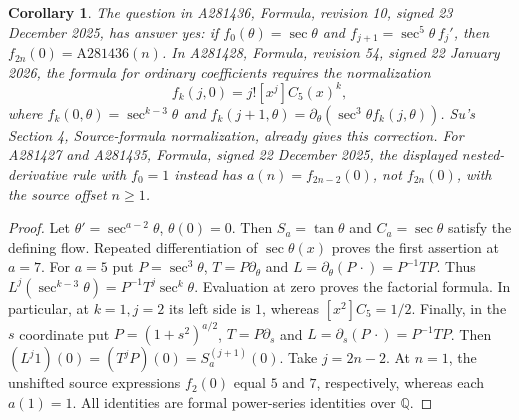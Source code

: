 \documentclass[11pt]{article}
\newtheorem{corollary}[theorem]{Corollary}
\newcommand{\Q}{\mathbb Q}
\begin{document}
\begin{corollary}\label{cor:formulas}
The question in A281436, Formula, revision 10, signed
23 December 2025, has answer yes: if
$f_0(\theta)=\sec\theta$ and
$f_{j+1}=\sec^5\theta\,f_j'$, then
$f_{2n}(0)=\mathrm{A281436}(n)$.
In A281428, Formula, revision 54, signed 22 January 2026,
the formula for ordinary coefficients requires the normalization
\[
 f_k(j,0)=j![x^j]C_5(x)^k,
\]
where $f_k(0,\theta)=\sec^{k-3}\theta$ and
$f_k(j+1,\theta)=\partial_\theta(\sec^3\theta f_k(j,\theta))$.
Su's Section 4, Source-formula normalization, already gives this correction.
For A281427 and A281435, Formula, signed 22 December 2025,
the displayed nested-derivative rule with $f_0=1$ instead has
$a(n)=f_{2n-2}(0)$, not $f_{2n}(0)$, with the source offset $n\ge1$.
\end{corollary}
\begin{proof}
Let $\theta'=\sec^{a-2}\theta$, $\theta(0)=0$.
Then $S_a=\tan\theta$ and $C_a=\sec\theta$ satisfy the defining flow.
Repeated differentiation of $\sec\theta(x)$ proves the first assertion
at $a=7$.
For $a=5$ put $P=\sec^3\theta$, $T=P\partial_\theta$ and
$L=\partial_\theta(P\,\cdot)=P^{-1}TP$.
Thus $L^j(\sec^{k-3}\theta)=P^{-1}T^j\sec^k\theta$.
Evaluation at zero proves the factorial formula. In particular,
at $k=1,j=2$ its left side is $1$, whereas $[x^2]C_5=1/2$.
Finally, in the $s$ coordinate put $P=(1+s^2)^{a/2}$,
$T=P\partial_s$ and $L=\partial_s(P\,\cdot)=P^{-1}TP$.
Then $(L^j1)(0)=(T^jP)(0)=S_a^{(j+1)}(0)$.
Take $j=2n-2$. At $n=1$, the unshifted source expressions
$f_2(0)$ equal $5$ and $7$, respectively, whereas each $a(1)=1$.
All identities are formal power-series identities over $\Q$.
\end{proof}
\end{document}

